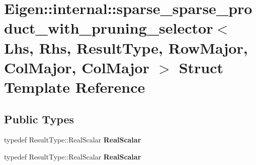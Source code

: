 \hypertarget{struct_eigen_1_1internal_1_1sparse__sparse__product__with__pruning__selector_3_01_lhs_00_01_rhs_a29c87f6ec217a6cab39d35f96e8e389}{}\section{Eigen\+:\+:internal\+:\+:sparse\+\_\+sparse\+\_\+product\+\_\+with\+\_\+pruning\+\_\+selector$<$ Lhs, Rhs, Result\+Type, Row\+Major, Col\+Major, Col\+Major $>$ Struct Template Reference}
\label{struct_eigen_1_1internal_1_1sparse__sparse__product__with__pruning__selector_3_01_lhs_00_01_rhs_a29c87f6ec217a6cab39d35f96e8e389}
\subsection*{Public Types}
\begin{DoxyCompactItemize}
\item 
\mbox{\label{struct_eigen_1_1internal_1_1sparse__sparse__product__with__pruning__selector_3_01_lhs_00_01_rhs_a29c87f6ec217a6cab39d35f96e8e389_a983f5a1654a48ab324cf8cb9ba600682}} 
typedef Result\+Type\+::\+Real\+Scalar {\bfseries Real\+Scalar}
\item 
\mbox{\label{struct_eigen_1_1internal_1_1sparse__sparse__product__with__pruning__selector_3_01_lhs_00_01_rhs_a29c87f6ec217a6cab39d35f96e8e389_a983f5a1654a48ab324cf8cb9ba600682}} 
typedef Result\+Type\+::\+Real\+Scalar {\bfseries Real\+Scalar}
\end{DoxyCompactItemize}
